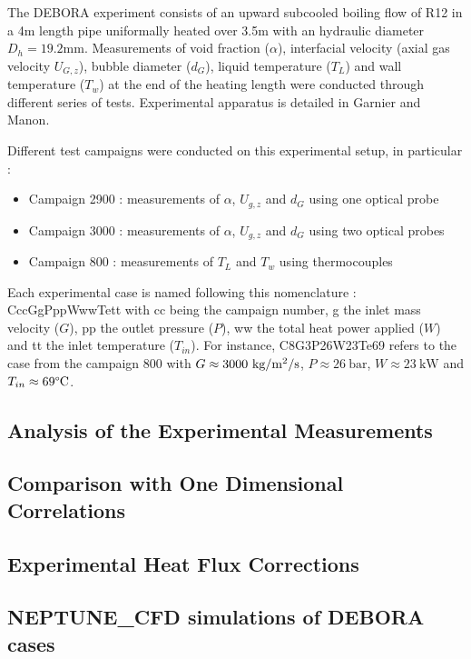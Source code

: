 The DEBORA experiment consists of an upward subcooled boiling flow of R12 in a 4m length pipe uniformally heated over 3.5m with an hydraulic diameter $D_{h}=19.2\text{mm}$. Measurements of void fraction ($\alpha$), interfacial velocity (\ie axial gas velocity $U_{G,z}$), bubble diameter ($d_{G}$), liquid temperature ($T_{L}$) and wall temperature ($T_{w}$) at the end of the heating length were conducted through different series of tests. Experimental apparatus is detailed in {Garnier} \etal\cite{Garnier2001} and {Manon}\cite{Manon2000}.

Different test campaigns were conducted on this experimental setup, in particular :

\begin{itemize}
\item Campaign 2900 : measurements of $\alpha$, $U_{g,z}$ and $d_{G}$ using one optical probe
\item Campaign 3000 : measurements of $\alpha$, $U_{g,z}$ and $d_{G}$ using two optical probes 
\item Campaign 800 : measurements of $T_{L}$ and $T_{w}$ using thermocouples
\end{itemize}

Each experimental case is named following this nomenclature : CccGgPppWwwTett with cc being the campaign number, g the inlet mass velocity ($G$), pp the outlet pressure ($P$), ww the total heat power applied ($W$) and tt the inlet temperature ($T_{in}$).
For instance, C8G3P26W23Te69 refers to the case from the campaign 800 with $G\approx 3000~\text{kg/m$^{2}$/s}$, $P\approx 26~\text{bar}$, $W\approx 23~\text{kW}$ and $T_{in}\approx 69\degree\text{C}$.

\subsection{Analysis of the Experimental Measurements}

\subsection{Comparison with One Dimensional Correlations}

\subsection{Experimental Heat Flux Corrections}

\subsection{NEPTUNE\_CFD simulations of DEBORA cases}

